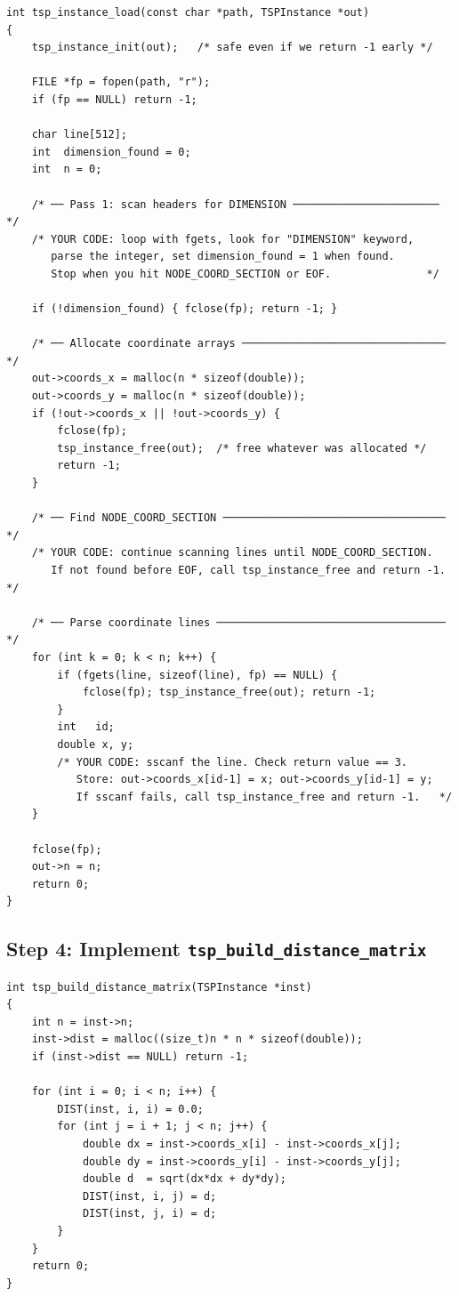 \begin{lstlisting}[style=cstyle]
int tsp_instance_load(const char *path, TSPInstance *out)
{
    tsp_instance_init(out);   /* safe even if we return -1 early */

    FILE *fp = fopen(path, "r");
    if (fp == NULL) return -1;

    char line[512];
    int  dimension_found = 0;
    int  n = 0;

    /* ── Pass 1: scan headers for DIMENSION ─────────────────────── */
    /* YOUR CODE: loop with fgets, look for "DIMENSION" keyword,
       parse the integer, set dimension_found = 1 when found.
       Stop when you hit NODE_COORD_SECTION or EOF.               */

    if (!dimension_found) { fclose(fp); return -1; }

    /* ── Allocate coordinate arrays ──────────────────────────────── */
    out->coords_x = malloc(n * sizeof(double));
    out->coords_y = malloc(n * sizeof(double));
    if (!out->coords_x || !out->coords_y) {
        fclose(fp);
        tsp_instance_free(out);  /* free whatever was allocated */
        return -1;
    }

    /* ── Find NODE_COORD_SECTION ─────────────────────────────────── */
    /* YOUR CODE: continue scanning lines until NODE_COORD_SECTION.
       If not found before EOF, call tsp_instance_free and return -1. */

    /* ── Parse coordinate lines ──────────────────────────────────── */
    for (int k = 0; k < n; k++) {
        if (fgets(line, sizeof(line), fp) == NULL) {
            fclose(fp); tsp_instance_free(out); return -1;
        }
        int   id;
        double x, y;
        /* YOUR CODE: sscanf the line. Check return value == 3.
           Store: out->coords_x[id-1] = x; out->coords_y[id-1] = y;
           If sscanf fails, call tsp_instance_free and return -1.   */
    }

    fclose(fp);
    out->n = n;
    return 0;
}
\end{lstlisting}

\subsection{Step 4: Implement \texttt{tsp\_build\_distance\_matrix}}

\begin{lstlisting}[style=cstyle]
int tsp_build_distance_matrix(TSPInstance *inst)
{
    int n = inst->n;
    inst->dist = malloc((size_t)n * n * sizeof(double));
    if (inst->dist == NULL) return -1;

    for (int i = 0; i < n; i++) {
        DIST(inst, i, i) = 0.0;
        for (int j = i + 1; j < n; j++) {
            double dx = inst->coords_x[i] - inst->coords_x[j];
            double dy = inst->coords_y[i] - inst->coords_y[j];
            double d  = sqrt(dx*dx + dy*dy);
            DIST(inst, i, j) = d;
            DIST(inst, j, i) = d;
        }
    }
    return 0;
}
\end{lstlisting}

